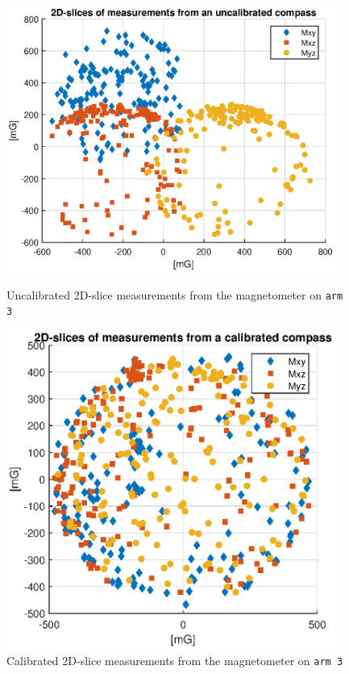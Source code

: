\begin{figure}[h!]
    \centering
    \begin{minipage}[t]{0.48\textwidth}
        \centering
        \includegraphics[width=0.96\textwidth]{figures/sensors/board3_uncalibrated_scatterplot.eps}
        \caption{Uncalibrated 2D-slice measurements from the magnetometer on \texttt{arm 3}}
        \label{fig:uncalibcompass}
    \end{minipage}%
    \hspace{.03\textwidth}
    \begin{minipage}[t]{0.48\textwidth}
        \centering
        \includegraphics[width=0.96\textwidth]{figures/sensors/board3_calibrated_scatterplot.eps}
        \caption{Calibrated 2D-slice measurements from the magnetometer on \texttt{arm 3}}
        \label{fig:calibcompass}
    \end{minipage}
\end{figure} 


